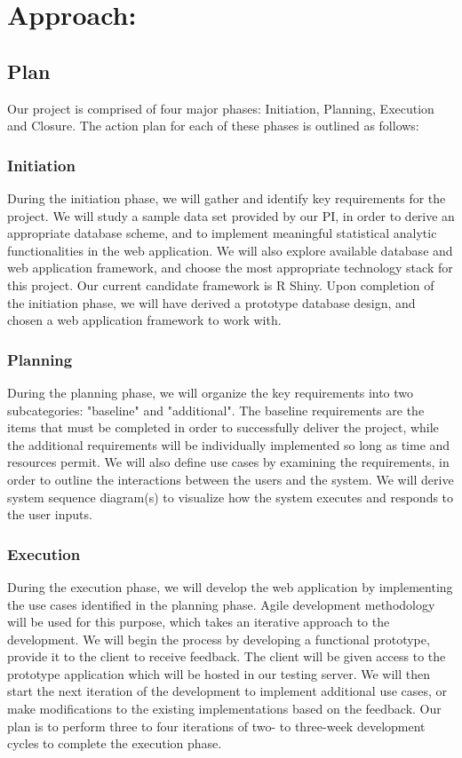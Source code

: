 \documentclass[10pt,twocolumn,letterpaper]{article}
\begin{document}
	   	\section{Approach:}

            \subsection{Plan}
            Our project is comprised of four major phases: Initiation, Planning, Execution and Closure. The action plan for each of these phases is outlined as follows:
                \subsubsection{Initiation}
                During the initiation phase, we will gather and identify key requirements for the project. 
                We will study a sample data set provided by our PI, in order to derive an appropriate database scheme, and to implement meaningful statistical analytic functionalities in the web application. 
                We will also explore available database and web application framework, and choose the most appropriate technology stack for this project. Our current candidate framework is R Shiny.
                Upon completion of the initiation phase, we will have derived a prototype database design, and chosen a web application framework to work with.
                \subsubsection{Planning}
                During the planning phase, we will organize the key requirements into two subcategories: "baseline" and "additional". 
                The baseline requirements are the items that must be completed in order to successfully deliver the project, while the additional requirements will be individually implemented so long as time and resources permit. 
                We will also define use cases by examining the requirements, in order to outline the interactions between the users and the system. We will derive system sequence diagram(s) to visualize how the system executes and responds to the user inputs.
                \subsubsection{Execution}
                During the execution phase, we will develop the web application by implementing the use cases identified in the planning phase. 
                Agile development methodology will be used for this purpose, which takes an iterative approach to the development. 
                We will begin the process by developing a functional prototype, provide it to the client to receive feedback. 
                The client will be given access to the prototype application which will be hosted in our testing server. 
                We will then start the next iteration of the development to implement additional use cases, or make modifications to the existing implementations based on the feedback. Our plan is to perform three to four iterations of two- to three-week development cycles to complete the execution phase.
\end{document}
